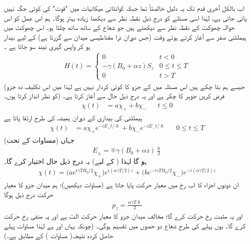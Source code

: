  اب بالکل آخری قدم تک یہ دلیل خالصتاً    تھا جبکہ کوانٹائی میکانیات میں "قوت" کی کوئی جگہ نہیں پائی جاتی ہے، لہٰذا اسی مسئلے کو درج ذیل نقطہ نظر سے دیکھنا زیادہ بہتر ہوگا۔  ہم اس عمل کو اس حوالہ چھوکٹ کے نقطہ نظر سے دیکھتے ہیں جو شعاع کے ساتھ ساتھ چلتا ہو۔ اس چھوکٹ میں ہیملٹنی صفر سے آغاز  کرتے ہوئے وقت  (جس دوران ذرا مقناطیسی میدان سے گزرتا ہے)  کے لیے بیدار ہو کر واپس گہری نیند سو جاتا ہے ۔
\begin{align}
H (t) = 
\begin{cases}
0 & t < 0 \\
- \gamma (B_0 + \alpha z) S_z & 0 \le t \le T \\
0 & t > T
\end{cases}
\end{align}
(جیسے ہم بتا چکے ہیں اس مسئلہ میں  کے  جزو کا کوئی کردار نہیں ہے لہٰذا میں اس تکلیف دہ جزو کو نظر انداز کرتا ہوں۔) فرض کریں جوہر کا چکر  ہے اور یہ درج ذیل حال سے آغاز  کرتا ہے۔ 
\begin{align*}
\chi (t) &= a \chi_{+} + b\chi_{-} && t\le 0
\end{align*}
ہیملٹنی کی بیداری کے دوران   ہمیشہ کی طرح ارتقا پاتا ہے 
\begin{align*}
\chi (t) &= a \chi_{+} e^{- i E_{+} t/\hslash} + b \chi_{-} e^{- i E_{-} t/\hslash} && 0 \le  t \le T
\end{align*}
جہاں (مساوات   کے تحت) 
\begin{align}
E_{\pm} = \mp \gamma (B_0 + \alpha z) \frac{\hslash}{2}
\end{align} 
 ہو گا لہٰذا (  کے لیے)  یہ درج ذیل حال اختیار کرے گا۔ 
\begin{align}
\chi (t) = \big ( a e^{i \gamma T B_0 /2} \chi_{+} \big ) e^{i (\alpha \gamma T/2) z} + \big ( b e^{- i \gamma T B_0 /2} \chi_{-} \big ) e^{- i (\alpha \gamma T/2) z}
\end{align}
ان دونوں اجزاء کا اب  رخ میں   معیار حرکت پایا جاتا ہے (مساوات  دیکھیں)؛   ہم  میدان جزو کا معیار حرکت درج ذیل ہوگا 
\begin{align}\label{مساوات_تین_ابعادی_کوانٹائی_زیڈ_معیار_حرکت}
p_z = \frac{\alpha \gamma T \hslash}{2}
\end{align}
اور یہ مثبت  رخ  حرکت  کرے گا؛  مخالف میدان جزو کا معیار حرکت الٹ ہے اور یہ منفی  رخ  حرکت کرے گا۔ یوں پہلے کی طرح شعاع دو حصوں میں تقسیم ہوگی۔  (چونکہ 
یہاں  اور   ہے لہٰذا مساوات   پہلے حاصل کردہ  نتیجہ( مساوات  )   کے مطابق ہے۔)

